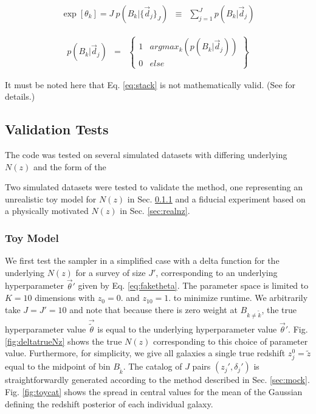 \documentclass[preprint]{aastex}
\begin{document}
\begin{eqnarray}
\label{eq:stack}
\exp[\theta_{k}] = J\ p(B_{k}|\{\vec{d}_{j}\}_{J}) &\equiv& \sum_{j=1}^{J}p(B_{k}|\vec{d}_{j})
\end{eqnarray}

\begin{eqnarray}
\label{eq:map}
p(B_{k}|\vec{d}_{j}) &=& \left\{\begin{array}{cc}1&argmax_{k}(p(B_{k}|\vec{d}_{j}))\\0&else\end{array}\right\}
\end{eqnarray}

It must be noted here that Eq. \ref{eq:stack} is not mathematically valid.  (See \citet{hog12} for details.)

\subsection{Validation Tests}
\label{sec:valid}

The code was tested on several simulated datasets with differing underlying $N(z)$ and the form of the 

Two simulated datasets were tested to validate the method, one representing an unrealistic toy model for $N(z)$ in Sec. \ref{sec:fake} and a fiducial experiment based on a physically motivated $N(z)$ in Sec. \ref{sec:realnz}.%

\subsubsection{Toy Model}
\label{sec:fake}

We first test the sampler in a simplified case with a delta function for the underlying $N(z)$ for a survey of size $J'$, corresponding to an underlying hyperparameter $\vec{\theta}'$ given by Eq. \ref{eq:faketheta}.  The parameter space is limited to $K=10$ dimensions with $z_{0}=0.$ and $z_{10}=1.$ to minimize runtime.  We arbitrarily take $J=J'=10$ and note that because there is zero weight at $B_{k\neq\tilde{k}}$, the true hyperparameter value $\vec{\tilde{\theta}}$ is equal to the underlying hyperparameter value $\vec{\theta}'$.  Fig. \ref{fig:deltatrueNz} shows the true $N(z)$ corresponding to this choice of parameter value.  Furthermore, for simplicity, we give all galaxies a single true redshift $z_{j}^{0}=\tilde{z}$ equal to the midpoint of bin $B_{\tilde{k}}$.  The catalog of $J$ pairs $(z_{j}',\delta_{j}')$ is straightforwardly generated according to the method described in Sec. \ref{sec:mock}.  Fig. \ref{fig:toycat} shows the spread in central values for the mean of the Gaussian defining the redshift posterior of each individual galaxy.
\end{document}
